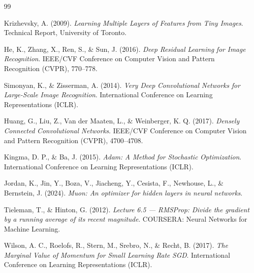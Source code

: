 \documentclass[12pt]{article}
\begin{document}
\newpage
\begin{thebibliography}{99}

Krizhevsky, A. (2009).
\textit{Learning Multiple Layers of Features from Tiny Images}.
Technical Report, University of Toronto.

He, K., Zhang, X., Ren, S., \& Sun, J. (2016).
\textit{Deep Residual Learning for Image Recognition}.
IEEE/CVF Conference on Computer Vision and Pattern Recognition (CVPR), 770--778.

Simonyan, K., \& Zisserman, A. (2014).
\textit{Very Deep Convolutional Networks for Large-Scale Image Recognition}.
International Conference on Learning Representations (ICLR).

Huang, G., Liu, Z., Van der Maaten, L., \& Weinberger, K. Q. (2017).
\textit{Densely Connected Convolutional Networks}.
IEEE/CVF Conference on Computer Vision and Pattern Recognition (CVPR), 4700--4708.

Kingma, D. P., \& Ba, J. (2015).
\textit{Adam: A Method for Stochastic Optimization}.
International Conference on Learning Representations (ICLR).

Jordan, K., Jin, Y., Boza, V., Jiacheng, Y., Cesista, F., Newhouse, L., \& Bernstein, J. (2024).
\textit{Muon: An optimizer for hidden layers in neural networks}.


Tieleman, T., \& Hinton, G. (2012).
\textit{Lecture 6.5 — RMSProp: Divide the gradient by a running average of its recent magnitude}.
COURSERA: Neural Networks for Machine Learning.

Wilson, A. C., Roelofs, R., Stern, M., Srebro, N., \& Recht, B. (2017).
\textit{The Marginal Value of Momentum for Small Learning Rate SGD}.
International Conference on Learning Representations (ICLR).


\end{thebibliography}
\end{document}
